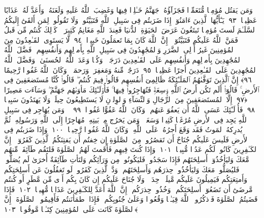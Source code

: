  وَمَن يَقتُل مُؤمِنًۭا مُّتَعَمِّدًۭا فَجَزَآؤُهُۥ جَهَنَّمُ خَـٰلِدًۭا فِيهَا وَغَضِبَ ٱللَّهُ عَلَيهِ وَلَعَنَهُۥ وَأَعَدَّ لَهُۥ عَذَابًا عَظِيمًۭا ﴿٩٣﴾
 يَـٰٓأَيُّهَا ٱلَّذِينَ ءَامَنُوٓا۟ إِذَا ضَرَبتُم فِى سَبِيلِ ٱللَّهِ فَتَبَيَّنُوا۟ وَلَا تَقُولُوا۟ لِمَن أَلقَىٰٓ إِلَيكُمُ ٱلسَّلَـٰمَ لَستَ مُؤمِنًۭا تَبتَغُونَ عَرَضَ ٱلحَيَوٰةِ ٱلدُّنيَا فَعِندَ ٱللَّهِ مَغَانِمُ كَثِيرَةٌۭ ۚ كَذَٟلِكَ كُنتُم مِّن قَبلُ فَمَنَّ ٱللَّهُ عَلَيكُم فَتَبَيَّنُوٓا۟ ۚ إِنَّ ٱللَّهَ كَانَ بِمَا تَعمَلُونَ خَبِيرًۭا ﴿٩٤﴾
 لَّا يَستَوِى ٱلقَـٰعِدُونَ مِنَ ٱلمُؤمِنِينَ غَيرُ أُو۟لِى ٱلضَّرَرِ وَٱلمُجَٰهِدُونَ فِى سَبِيلِ ٱللَّهِ بِأَموَٟلِهِم وَأَنفُسِهِم ۚ فَضَّلَ ٱللَّهُ ٱلمُجَٰهِدِينَ بِأَموَٟلِهِم وَأَنفُسِهِم عَلَى ٱلقَـٰعِدِينَ دَرَجَةًۭ ۚ وَكُلًّۭا وَعَدَ ٱللَّهُ ٱلحُسنَىٰ ۚ وَفَضَّلَ ٱللَّهُ ٱلمُجَٰهِدِينَ عَلَى ٱلقَـٰعِدِينَ أَجرًا عَظِيمًۭا ﴿٩٥﴾
 دَرَجَٰتٍۢ مِّنهُ وَمَغفِرَةًۭ وَرَحمَةًۭ ۚ وَكَانَ ٱللَّهُ غَفُورًۭا رَّحِيمًا ﴿٩٦﴾
 إِنَّ ٱلَّذِينَ تَوَفَّىٰهُمُ ٱلمَلَـٰٓئِكَةُ ظَالِمِىٓ أَنفُسِهِم قَالُوا۟ فِيمَ كُنتُم ۖ قَالُوا۟ كُنَّا مُستَضعَفِينَ فِى ٱلأَرضِ ۚ قَالُوٓا۟ أَلَم تَكُن أَرضُ ٱللَّهِ وَٟسِعَةًۭ فَتُهَاجِرُوا۟ فِيهَا ۚ فَأُو۟لَـٰٓئِكَ مَأوَىٰهُم جَهَنَّمُ ۖ وَسَآءَت مَصِيرًا ﴿٩٧﴾
 إِلَّا ٱلمُستَضعَفِينَ مِنَ ٱلرِّجَالِ وَٱلنِّسَآءِ وَٱلوِلدَٟنِ لَا يَستَطِيعُونَ حِيلَةًۭ وَلَا يَهتَدُونَ سَبِيلًۭا ﴿٩٨﴾
 فَأُو۟لَـٰٓئِكَ عَسَى ٱللَّهُ أَن يَعفُوَ عَنهُم ۚ وَكَانَ ٱللَّهُ عَفُوًّا غَفُورًۭا ﴿٩٩﴾
 ۞ وَمَن يُهَاجِر فِى سَبِيلِ ٱللَّهِ يَجِد فِى ٱلأَرضِ مُرَٰغَمًۭا كَثِيرًۭا وَسَعَةًۭ ۚ وَمَن يَخرُج مِنۢ بَيتِهِۦ مُهَاجِرًا إِلَى ٱللَّهِ وَرَسُولِهِۦ ثُمَّ يُدرِكهُ ٱلمَوتُ فَقَد وَقَعَ أَجرُهُۥ عَلَى ٱللَّهِ ۗ وَكَانَ ٱللَّهُ غَفُورًۭا رَّحِيمًۭا ﴿١٠٠﴾
 وَإِذَا ضَرَبتُم فِى ٱلأَرضِ فَلَيسَ عَلَيكُم جُنَاحٌ أَن تَقصُرُوا۟ مِنَ ٱلصَّلَوٰةِ إِن خِفتُم أَن يَفتِنَكُمُ ٱلَّذِينَ كَفَرُوٓا۟ ۚ إِنَّ ٱلكَـٰفِرِينَ كَانُوا۟ لَكُم عَدُوًّۭا مُّبِينًۭا ﴿١٠١﴾
 وَإِذَا كُنتَ فِيهِم فَأَقَمتَ لَهُمُ ٱلصَّلَوٰةَ فَلتَقُم طَآئِفَةٌۭ مِّنهُم مَّعَكَ وَليَأخُذُوٓا۟ أَسلِحَتَهُم فَإِذَا سَجَدُوا۟ فَليَكُونُوا۟ مِن وَرَآئِكُم وَلتَأتِ طَآئِفَةٌ أُخرَىٰ لَم يُصَلُّوا۟ فَليُصَلُّوا۟ مَعَكَ وَليَأخُذُوا۟ حِذرَهُم وَأَسلِحَتَهُم ۗ وَدَّ ٱلَّذِينَ كَفَرُوا۟ لَو تَغفُلُونَ عَن أَسلِحَتِكُم وَأَمتِعَتِكُم فَيَمِيلُونَ عَلَيكُم مَّيلَةًۭ وَٟحِدَةًۭ ۚ وَلَا جُنَاحَ عَلَيكُم إِن كَانَ بِكُم أَذًۭى مِّن مَّطَرٍ أَو كُنتُم مَّرضَىٰٓ أَن تَضَعُوٓا۟ أَسلِحَتَكُم ۖ وَخُذُوا۟ حِذرَكُم ۗ إِنَّ ٱللَّهَ أَعَدَّ لِلكَـٰفِرِينَ عَذَابًۭا مُّهِينًۭا ﴿١٠٢﴾
 فَإِذَا قَضَيتُمُ ٱلصَّلَوٰةَ فَٱذكُرُوا۟ ٱللَّهَ قِيَـٰمًۭا وَقُعُودًۭا وَعَلَىٰ جُنُوبِكُم ۚ فَإِذَا ٱطمَأنَنتُم فَأَقِيمُوا۟ ٱلصَّلَوٰةَ ۚ إِنَّ ٱلصَّلَوٰةَ كَانَت عَلَى ٱلمُؤمِنِينَ كِتَـٰبًۭا مَّوقُوتًۭا ﴿١٠٣﴾
